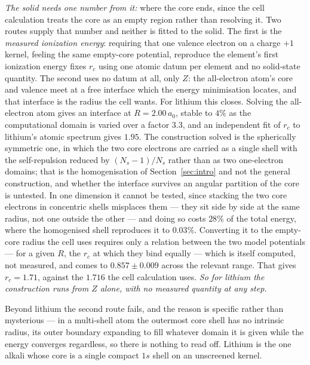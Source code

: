 \documentclass[11pt]{article}
\begin{document}
\emph{The solid needs one number from it:} where the core ends, since the cell calculation treats
the core as an empty region rather than resolving it. Two routes supply that number and neither is
fitted to the solid. The first is the \emph{measured ionization energy}: requiring that one valence
electron on a charge $+1$ kernel, feeling the same empty-core potential, reproduce the element's
first ionization energy fixes $r_c$ using one atomic datum per element and no solid-state quantity.
The second uses no datum at all, only $Z$: the all-electron atom's core and valence meet at a free
interface which the energy minimisation locates, and that interface is the radius the cell wants.
For lithium this closes. Solving the all-electron atom gives an interface at $R=2.00\,a_0$, stable
to $4\%$ as the computational domain is varied over a factor $3.3$, and an independent fit of $r_c$
to lithium's atomic spectrum gives $1.95$. The construction solved is the spherically symmetric one,
in which the two core electrons are carried as a single shell with the self-repulsion reduced by
$(N_s-1)/N_s$ rather than as two one-electron domains; that is the homogenisation of
Section~\ref{sec:intro} and not the general construction, and whether the interface survives an
angular partition of the core is untested. In one dimension it cannot be tested, since stacking the
two core electrons in concentric shells misplaces them --- they sit side by side at the same radius,
not one outside the other --- and doing so costs $28\%$ of the total energy, where the homogenised
shell reproduces it to $0.03\%$. Converting it to the empty-core
radius the cell uses requires only a relation between the two model potentials --- for a given $R$,
the $r_c$ at which they bind equally --- which is itself computed, not measured, and comes to
$0.857\pm0.009$ across the relevant range. That gives $r_c = 1.71$, against the $1.716$ the cell
calculation uses. \emph{So for lithium the construction runs from $Z$ alone, with no measured
quantity at any step.}

Beyond lithium the second route fails, and the reason is specific rather than mysterious --- in a
multi-shell atom the outermost core shell has no intrinsic radius, its outer boundary expanding to
fill whatever domain it is given while the energy converges regardless, so there is nothing to read
off. Lithium is the one alkali whose core is a single compact $1s$ shell on an unscreened kernel.
\end{document}
